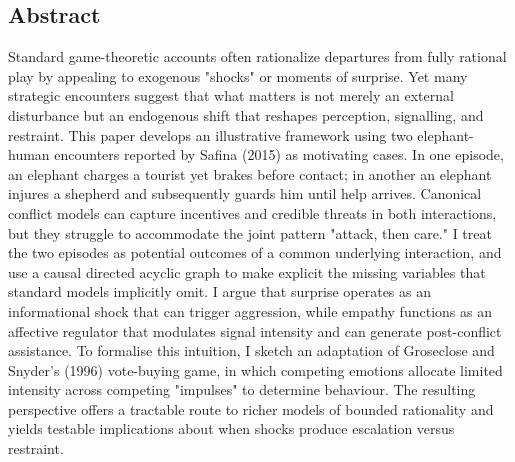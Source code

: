 
\begin{center}
    \subsection*{Abstract}
\end{center}

Standard game-theoretic accounts often rationalize departures from fully rational play by appealing to exogenous "shocks" or moments of surprise. Yet many strategic encounters suggest that what matters is not merely an external disturbance but an endogenous shift that reshapes perception, signalling, and restraint. This paper develops an illustrative framework using two elephant-human encounters reported by Safina (2015) as motivating cases. In one episode, an elephant charges a tourist yet brakes before contact; in another an elephant injures a shepherd and subsequently guards him until help arrives. Canonical conflict models can capture incentives and credible threats in both interactions, but they struggle to accommodate the joint pattern "attack, then care." I treat the two episodes as potential outcomes of a common underlying interaction, and use a causal directed acyclic graph to make explicit the missing variables that standard models implicitly omit. I argue that surprise operates as an informational shock that can trigger aggression, while empathy functions as an affective regulator that modulates signal intensity and can generate post-conflict assistance. To formalise this intuition, I sketch an adaptation of Groseclose and Snyder's (1996) vote-buying game, in which competing emotions allocate limited intensity across competing "impulses" to determine behaviour. The resulting perspective offers a tractable route to richer models of bounded rationality and yields testable implications about when shocks produce escalation versus restraint.

